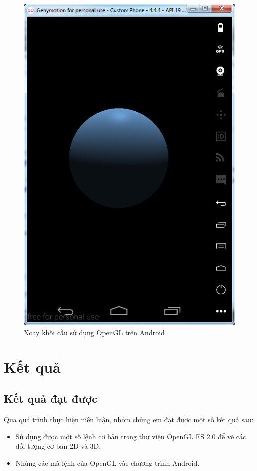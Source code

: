 \documentclass[13pt,a4paper]{extreport}
\begin{document}
\begin{itemize}
\begin{figure}[!h]
\begin{center}
					\includegraphics[scale=.6]{images/opengles-circle-2.png}
				\end{center}
				\caption{Xoay khối cầu sử dụng OpenGL trên Android}
				\label{Fig:opengles-circle}
			\end{figure}		
	\end{itemize}

\chapter{Kết quả}
\section{Kết quả đạt được}
	Qua quá trình thực hiện niên luận, nhóm chúng em đạt được một số kết quả sau:
		\begin{itemize}
			\item Sử dụng được một số lệnh cơ bản trong thư viện OpenGL ES 2.0 để vẽ các đối tượng cơ bản 2D và 3D.
			
			\item Nhúng các mã lệnh của OpenGL vào chương trình Android.
		\end{itemize}
\end{document}
